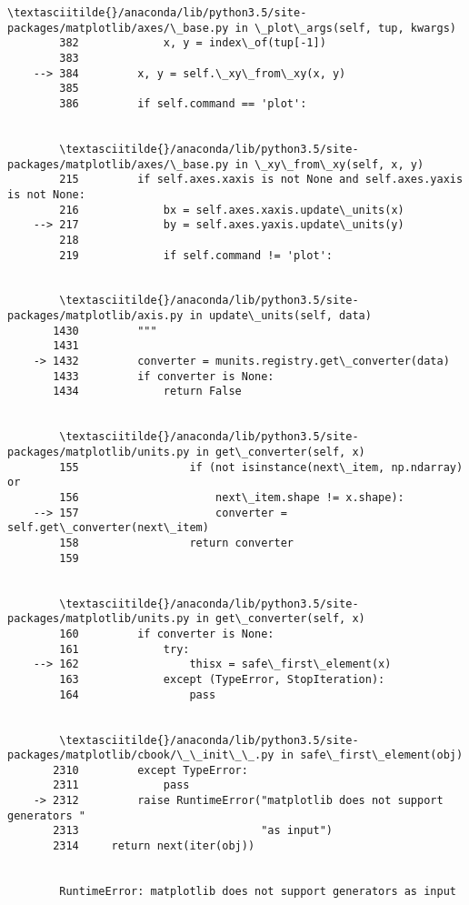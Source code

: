 \documentclass[11pt]{article}
\begin{document}
\begin{Verbatim}[commandchars=\\\{\}]
        \textasciitilde{}/anaconda/lib/python3.5/site-packages/matplotlib/axes/\_base.py in \_plot\_args(self, tup, kwargs)
        382             x, y = index\_of(tup[-1])
        383 
    --> 384         x, y = self.\_xy\_from\_xy(x, y)
        385 
        386         if self.command == 'plot':


        \textasciitilde{}/anaconda/lib/python3.5/site-packages/matplotlib/axes/\_base.py in \_xy\_from\_xy(self, x, y)
        215         if self.axes.xaxis is not None and self.axes.yaxis is not None:
        216             bx = self.axes.xaxis.update\_units(x)
    --> 217             by = self.axes.yaxis.update\_units(y)
        218 
        219             if self.command != 'plot':


        \textasciitilde{}/anaconda/lib/python3.5/site-packages/matplotlib/axis.py in update\_units(self, data)
       1430         """
       1431 
    -> 1432         converter = munits.registry.get\_converter(data)
       1433         if converter is None:
       1434             return False


        \textasciitilde{}/anaconda/lib/python3.5/site-packages/matplotlib/units.py in get\_converter(self, x)
        155                 if (not isinstance(next\_item, np.ndarray) or
        156                     next\_item.shape != x.shape):
    --> 157                     converter = self.get\_converter(next\_item)
        158                 return converter
        159 


        \textasciitilde{}/anaconda/lib/python3.5/site-packages/matplotlib/units.py in get\_converter(self, x)
        160         if converter is None:
        161             try:
    --> 162                 thisx = safe\_first\_element(x)
        163             except (TypeError, StopIteration):
        164                 pass


        \textasciitilde{}/anaconda/lib/python3.5/site-packages/matplotlib/cbook/\_\_init\_\_.py in safe\_first\_element(obj)
       2310         except TypeError:
       2311             pass
    -> 2312         raise RuntimeError("matplotlib does not support generators "
       2313                            "as input")
       2314     return next(iter(obj))


        RuntimeError: matplotlib does not support generators as input

    \end{Verbatim}

    \begin{center}
    \end{center}
    { \hspace*{\fill} \\}
    
\end{document}
